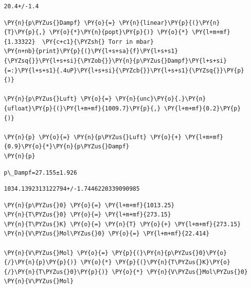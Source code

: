     \begin{Verbatim}[commandchars=\\\{\}]
20.4+/-1.4
    \end{Verbatim}

    \begin{tcolorbox}[breakable, size=fbox, boxrule=1pt, pad at break*=1mm,colback=cellbackground, colframe=cellborder]
\begin{Verbatim}[commandchars=\\\{\}]
\PY{n}{p\PYZus{}Dampf} \PY{o}{=} \PY{n}{linear}\PY{p}{(}\PY{n}{T}\PY{p}{,} \PY{o}{*}\PY{n}{popt}\PY{p}{)} \PY{o}{*} \PY{l+m+mf}{1.33322}  \PY{c+c1}{\PYZsh{} Torr in mbar}
\PY{n+nb}{print}\PY{p}{(}\PY{l+s+sa}{f}\PY{l+s+s1}{\PYZsq{}}\PY{l+s+si}{\PYZob{}}\PY{n}{p\PYZus{}Dampf}\PY{l+s+si}{=:}\PY{l+s+s1}{.4uP}\PY{l+s+si}{\PYZcb{}}\PY{l+s+s1}{\PYZsq{}}\PY{p}{)}

\PY{n}{p\PYZus{}Luft} \PY{o}{=} \PY{n}{unc}\PY{o}{.}\PY{n}{ufloat}\PY{p}{(}\PY{l+m+mf}{1009.7}\PY{p}{,} \PY{l+m+mf}{0.2}\PY{p}{)}

\PY{n}{p} \PY{o}{=} \PY{n}{p\PYZus{}Luft} \PY{o}{+} \PY{l+m+mf}{0.9}\PY{o}{*}\PY{n}{p\PYZus{}Dampf}
\PY{n}{p}
\end{Verbatim}
\end{tcolorbox}

    \begin{Verbatim}[commandchars=\\\{\}]
p\_Dampf=27.155±1.926
    \end{Verbatim}

            \begin{tcolorbox}[breakable, size=fbox, boxrule=.5pt, pad at break*=1mm, opacityfill=0]
\begin{Verbatim}[commandchars=\\\{\}]
1034.1392313122794+/-1.7446220339090985
\end{Verbatim}
\end{tcolorbox}
        
    \begin{tcolorbox}[breakable, size=fbox, boxrule=1pt, pad at break*=1mm,colback=cellbackground, colframe=cellborder]
\begin{Verbatim}[commandchars=\\\{\}]
\PY{n}{p\PYZus{}0} \PY{o}{=} \PY{l+m+mf}{1013.25}
\PY{n}{T\PYZus{}0} \PY{o}{=} \PY{l+m+mf}{273.15}
\PY{n}{T\PYZus{}K} \PY{o}{=} \PY{n}{T} \PY{o}{+} \PY{l+m+mf}{273.15}
\PY{n}{V\PYZus{}Mol\PYZus{}0} \PY{o}{=} \PY{l+m+mf}{22.414}

\PY{n}{V\PYZus{}Mol} \PY{o}{=} \PY{p}{(}\PY{n}{p\PYZus{}0}\PY{o}{/}\PY{n}{p}\PY{p}{)} \PY{o}{*} \PY{p}{(}\PY{n}{T\PYZus{}K}\PY{o}{/}\PY{n}{T\PYZus{}0}\PY{p}{)} \PY{o}{*} \PY{n}{V\PYZus{}Mol\PYZus{}0}
\PY{n}{V\PYZus{}Mol}
\end{Verbatim}
\end{tcolorbox}

